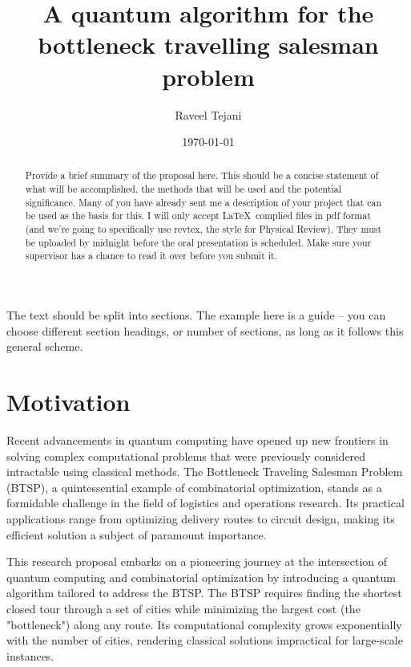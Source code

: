 \documentclass[twocolumn,showpacs,preprintnumbers,amsmath,amssymb]{revtex4}
\begin{document}
		
		\title{A quantum algorithm for the bottleneck travelling salesman problem}
		
		\author{Raveel Tejani}
		
		\date{\today}
		
		\begin{abstract}
			Provide a brief summary of the proposal here.  This should be a concise
			statement of what will be accomplished, the methods that will be used and
			the potential significance.  Many of you have already sent me a description
			of your project that can be used as the basis for this.  I will only accept
			\LaTeX\ complied files in pdf format (and we're going to specifically use
			revtex, the style for Physical Review). They must be uploaded by midnight
			before the oral presentation is scheduled.  Make sure your supervisor has
			a chance to read it over before you submit it.
		\end{abstract}
		
		\maketitle
		
		The text should be split into sections.  The example here is a guide -- you can
		choose different section headings, or number of sections, as long as it follows
		this general scheme.
		
		
		\section{Motivation}
		
		
		Recent advancements in quantum computing have opened up new frontiers in solving complex computational problems that were previously considered intractable using classical methods. The Bottleneck Traveling Salesman Problem (BTSP), a quintessential example of combinatorial optimization, stands as a formidable challenge in the field of logistics and operations research. Its practical applications range from optimizing delivery routes to circuit design, making its efficient solution a subject of paramount importance.
		
		This research proposal embarks on a pioneering journey at the intersection of quantum computing and combinatorial optimization by introducing a quantum algorithm tailored to address the BTSP. The BTSP requires finding the shortest closed tour through a set of cities while minimizing the largest cost (the "bottleneck") along any route. Its computational complexity grows exponentially with the number of cities, rendering classical solutions impractical for large-scale instances.
		
\end{document}
